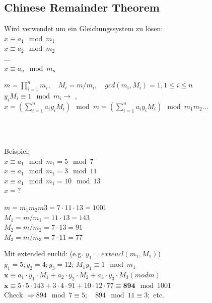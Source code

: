 \subsection{Chinese Remainder Theorem}
\begin{minipage}{8cm}
Wird verwendet um ein Gleichungssystem zu l\"osen: \\
$x \equiv a_1 \mod m_1$\\
$x \equiv a_2 \mod m_2$\\
$\ldots$\\
$x \equiv a_n \mod m_n$\\
\end{minipage}
\begin{minipage}{9cm}
$m=\displaystyle\prod_{i=1}^{n} m_i, \quad M_i=m/m_i, \quad gcd(m_i, M_i)=1, 1 \leq i \leq n$\\
$y_iM_i \equiv 1 \mod m_i \to$ , \\
$x=\left(\displaystyle\sum_{i=1}^{n} a_i  y_i M_i \right) \mod m=\left(\displaystyle\sum_{i=1}^{n} a_i  y_i M_i \right) \mod m_1 m_2 \ldots $
\end{minipage}\\
\\
\begin{minipage}{5cm}
Beispiel:\\
$x\equiv a_1 \mod m_1 = 5  \mod 7$\\
$x\equiv a_1 \mod m_1 = 3  \mod 11$\\
$x\equiv a_1 \mod m_1 = 10 \mod 13$\\
$x=?$
\end{minipage}
\begin{minipage}{5cm}
$m=m_1 m_2 m3 = 7\cdot 11 \cdot 13 = 1001$\\
$M_1=m/m_1=11 \cdot 13 = 143$\\
$M_2=m/m_2=7 \cdot 13 = 91$\\
$M_3=m/m_3=7 \cdot 11 = 77$\\
\end{minipage}
\begin{minipage}{8cm}
Mit extended euclid: (e.g. $y_1=exteucl(m_1,M_1)$)\\
$y_1=5;  y_2=4; y_3=12$; $M_1 y_1 \equiv 1 \mod m_1$\\
$\bm x\equiv a_1\cdot y_1\cdot M_1+a_2\cdot y_2\cdot M_2+a_3\cdot y_3\cdot M_3 (mod m)$\\
$\bm x\equiv 5\cdot5\cdot143+3\cdot4\cdot91+10\cdot12\cdot77 \equiv \bm{894} \mod 1001$\\
Check $\Rightarrow 894 \mod 7 \equiv 5; \quad 894 \mod 11 \equiv 3;$ etc.
\end{minipage}

